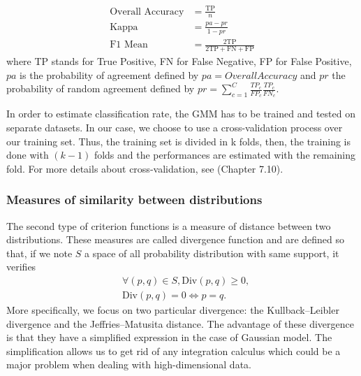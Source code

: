 \documentclass[a4paper,11pt,DIV=16]{scrartcl}
\begin{document}
        \begin{align}
            \text{Overall Accuracy} &= \frac{\text{TP}}{n} \\
            \text{Kappa} &= \frac{pa - pr}{1 - pr}  \\
            \text{F1 Mean} &= \frac{2 \text{TP}}{2 \text{TP} + \text{FN} + \text{FP}}
        \end{align}
        where TP stands for True Positive, FN for False Negative, FP for False Positive, $pa$ is the probability of agreement defined by $pa = Overall Accuracy$  and $pr$ the probability of random agreement defined by $pr = \sum_{c=1}^{C} \frac{TP_c}{FP_c} \frac{TP_c}{FN_c}$.

        In order to estimate classification rate, the GMM has to be trained and tested on separate datasets. In our case, we choose to use a cross-validation process over our training set. Thus, the training set is divided in k folds, then, the training is done with $(k-1)$ folds and the performances are estimated with the remaining fold. For more details about cross-validation, see \cite{opac-b1127878} (Chapter 7.10).

        \subsubsection{Measures of similarity between distributions}

        The second type of criterion functions is a measure of distance between two distributions. These measures are called divergence function and are defined so that, if we note $S$ a space of all probability distribution with same support, it verifies
        \begin{align*}
            &\forall (p,q) \in S, \text{Div}(p,q) \geq 0, \\
            &\text{Div}(p,q) = 0 \Leftrightarrow p = q.
        \end{align*}
        More specifically, we focus on two particular divergence: the Kullback–Leibler divergence and the Jeffries–Matusita distance. The advantage of these divergence is that they have a simplified expression in the case of Gaussian model. The simplification allows us to get rid of any integration calculus which could be a major problem when dealing with high-dimensional data.
\end{document}
